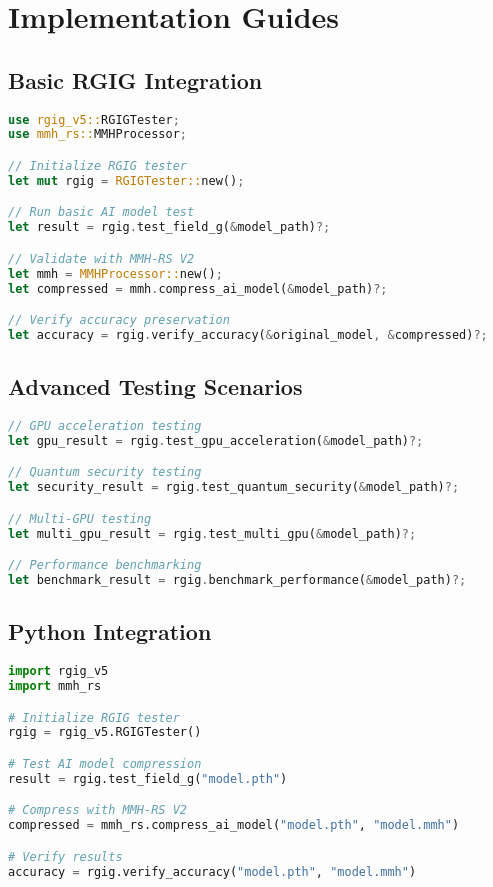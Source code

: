 \documentclass[12pt,a4paper]{article}
\begin{document}
\section{Implementation Guides}

\subsection{Basic RGIG Integration}
\begin{lstlisting}[language=Rust, caption=Basic RGIG Integration]
use rgig_v5::RGIGTester;
use mmh_rs::MMHProcessor;

// Initialize RGIG tester
let mut rgig = RGIGTester::new();

// Run basic AI model test
let result = rgig.test_field_g(&model_path)?;

// Validate with MMH-RS V2
let mmh = MMHProcessor::new();
let compressed = mmh.compress_ai_model(&model_path)?;

// Verify accuracy preservation
let accuracy = rgig.verify_accuracy(&original_model, &compressed)?;
\end{lstlisting}

\subsection{Advanced Testing Scenarios}
\begin{lstlisting}[language=Rust, caption=Advanced Testing]
// GPU acceleration testing
let gpu_result = rgig.test_gpu_acceleration(&model_path)?;

// Quantum security testing
let security_result = rgig.test_quantum_security(&model_path)?;

// Multi-GPU testing
let multi_gpu_result = rgig.test_multi_gpu(&model_path)?;

// Performance benchmarking
let benchmark_result = rgig.benchmark_performance(&model_path)?;
\end{lstlisting}

\subsection{Python Integration}
\begin{lstlisting}[language=Python, caption=Python RGIG Integration]
import rgig_v5
import mmh_rs

# Initialize RGIG tester
rgig = rgig_v5.RGIGTester()

# Test AI model compression
result = rgig.test_field_g("model.pth")

# Compress with MMH-RS V2
compressed = mmh_rs.compress_ai_model("model.pth", "model.mmh")

# Verify results
accuracy = rgig.verify_accuracy("model.pth", "model.mmh")
\end{lstlisting}
\end{document}

